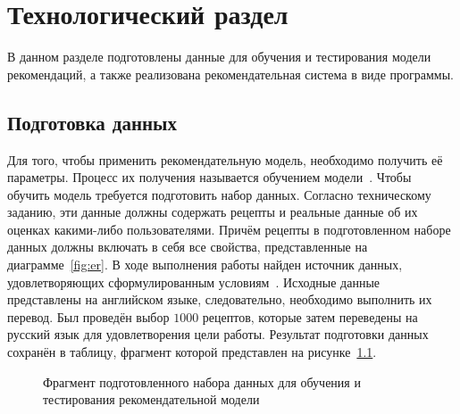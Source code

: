 \chapter{Технологический раздел}
В данном разделе подготовлены данные для обучения и тестирования модели рекомендаций, а также реализована рекомендательная система в виде программы.

\section{Подготовка данных}
Для того, чтобы применить рекомендательную модель, необходимо получить её параметры.
Процесс их получения называется обучением модели~\cite{aggarwal}.
Чтобы обучить модель требуется подготовить набор данных.
Согласно техническому заданию, эти данные должны содержать рецепты и реальные данные об их оценках какими-либо пользователями.
Причём рецепты в подготовленном наборе данных должны включать в себя все свойства, представленные на диаграмме~\ref{fig:er}.
В ходе выполнения работы найден источник данных, удовлетворяющих сформулированным условиям~\cite{recipe_dataset}.
Исходные данные представлены на английском языке, следовательно, необходимо выполнить их перевод.
Был проведён выбор $1000$ рецептов, которые затем переведены на русский язык для удовлетворения цели работы.
Результат подготовки данных сохранён в таблицу, фрагмент которой представлен на рисунке~\ref{fig:dataset}.
\begin{figure}[htbp]
	\centering
	\caption{
	    Фрагмент подготовленного набора данных для обучения и тестирования рекомендательной модели
	}
	\label{fig:dataset}
\end{figure}

